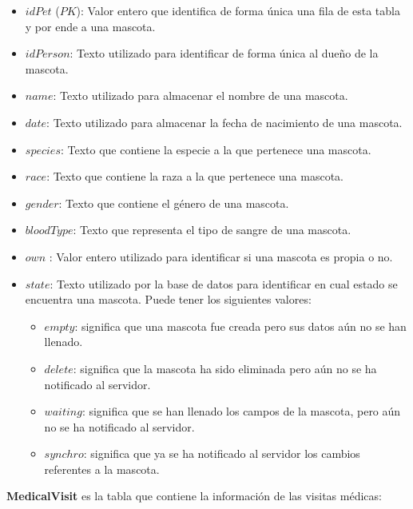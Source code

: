 \begin{itemize}
\item	$idPet$ ($PK$): Valor entero que identifica de forma única una fila de esta tabla y por ende a una mascota.
\item	$idPerson$: Texto utilizado para identificar de forma única al dueño de la mascota.
\item	$name$: Texto utilizado para almacenar el nombre de una mascota.
\item	$date$: Texto utilizado para almacenar la fecha de nacimiento de una mascota.
\item	$species$: Texto que contiene la especie a la que pertenece una mascota.
\item	$race$: Texto que contiene la raza a la que pertenece una mascota.
\item	$gender$: Texto que contiene el género de una mascota.
\item	$bloodType$: Texto que representa el tipo de sangre de una mascota.
\item	$own$ : Valor entero utilizado para identificar si una mascota es propia o no.
\item	$state$: Texto utilizado por la base de datos para identificar en cual estado se encuentra una mascota. Puede tener los siguientes valores:
\begin{itemize}
\item	$empty$: significa que una mascota fue creada pero sus datos aún no se han llenado.
\item	$delete$: significa que la mascota ha sido eliminada pero aún no se ha notificado al servidor.
\item	$waiting$: significa que se han llenado los campos de la mascota, pero aún no se ha notificado al servidor.
\item	$synchro$: significa que ya se ha notificado al servidor los cambios referentes a la mascota.
\end{itemize}
\end{itemize}

\textbf{MedicalVisit} es la tabla que contiene la información de las visitas médicas:

